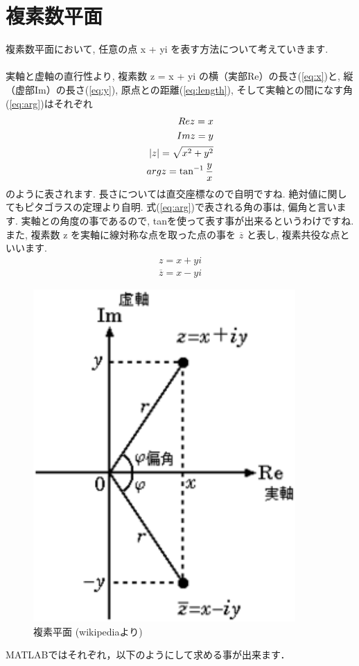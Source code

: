 \documentclass[11pt,a4paper,uplatex]{ujreport}
\begin{document}
\section{複素数平面}
複素数平面において, 任意の点 x + yi を表す方法について考えていきます. \\
\\
実軸と虚軸の直行性より, 複素数 z = x + yi の横（実部Re）の長さ(\ref{eq:x})と, 縦（虚部Im）の長さ(\ref{eq:y}), 原点との距離(\ref{eq:length}), そして実軸との間になす角(\ref{eq:arg})はそれぞれ
\begin{eqnarray}
\label{eq:vector}
\mathstrut Re z = x
\label{eq:x}
\\
\mathstrut Im z = y
\label{eq:y}
\\
|z| = \sqrt{x^2 + y^2}
\label{eq:length}\\
\mathstrut arg z = \tan^{-1} \frac{y}{x}
\label{eq:arg}
\end{eqnarray}
のように表されます. 長さについては直交座標なので自明ですね. 絶対値に関してもピタゴラスの定理より自明. 式(\ref{eq:arg})で表される角の事は, 偏角と言います. 実軸との角度の事であるので, tanを使って表す事が出来るというわけですね.\\

また, 複素数 z を実軸に線対称な点を取った点の事を $ \overline{z}$ と表し, 複素共役な点といいます.\\

\begin{eqnarray}
\label{eq:conj}
z = x + yi
\end{eqnarray}
\begin{eqnarray}
\overline{z} = x - yi
\end{eqnarray}

\begin{figure}[H]
\label{im:complex}
  \centering
  \includegraphics[width=100mm,bb=0 0 220 279]{../figures/Complex.png}
  \caption{複素平面 (wikipediaより)}
\end{figure}
MATLABではそれぞれ，以下のようにして求める事が出来ます．
\end{document}

